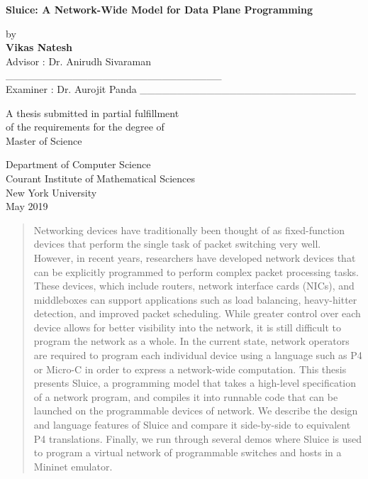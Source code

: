 \documentclass[12pt, oneside]{article}
\begin{document}
\doublespacing



\begin{titlepage}
    \begin{center}
        \vspace*{1cm}
 
        \Huge
        \textbf{Sluice: A Network-Wide Model for Data Plane Programming}
 
        \vspace{0.5cm}
        \Large
 
        \vspace{1.5cm}
 	by\\
        \textbf{Vikas Natesh}\\
 	Advisor : Dr. Anirudh Sivaraman    \_\_\_\_\_\_\_\_\_\_\_\_\_\_\_\_\_\_\_\_\_\_\_\_\_\_\_\_\_\\
	Examiner : Dr. Aurojit Panda \_\_\_\_\_\_\_\_\_\_\_\_\_\_\_\_\_\_\_\_\_\_\_\_\_\_\_\_\_
        \vfill
 
        \large
        A thesis submitted in partial fulfillment \\
        of the requirements for the degree of\\
		Master of Science
 
        \vspace{0.8cm}
  
        Department of Computer Science\\
        Courant Institute of Mathematical Sciences\\
        New York University\\
        May 2019
 
    \end{center}
\end{titlepage}

\begin{abstract}
Networking devices have traditionally been thought of as fixed-function devices that perform the single task of packet switching very well. However, in recent years, researchers have developed network devices that can be explicitly programmed to perform complex packet processing tasks. These devices, which include routers, network interface cards (NICs), and middleboxes can support applications such as load balancing, heavy-hitter detection, and improved packet scheduling. While greater control over each device allows for better visibility into the network, it is still difficult to program the network as a whole. In the current state, network operators are required to program each individual device using a language such as P4 or Micro-C in order to express a network-wide computation. This thesis presents Sluice, a programming model that takes a high-level specification of a network program, and compiles it into runnable code that can be launched on the programmable devices of network. We describe the design and language features of Sluice and compare it side-by-side to equivalent P4 translations. Finally, we run through several demos where Sluice is used to program a virtual network of programmable switches and hosts in a Mininet emulator.
\end{abstract}
\end{document}
